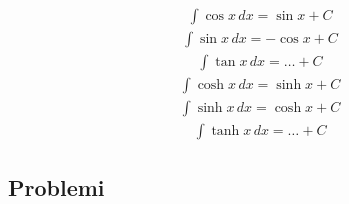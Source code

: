 \documentclass[letterpaper,10pt,italian]{jupyterBook}
\begin{document}
\begin{equation*}
\end{equation*}\begin{equation*}
\begin{split}\int \cos x \, dx = \sin x + C\end{split}
\end{equation*}\begin{equation*}
\begin{split}\int \sin x \, dx =-\cos x + C\end{split}
\end{equation*}\begin{equation*}
\begin{split}\int \tan x \, dx = \dots + C\end{split}
\end{equation*}\begin{equation*}
\begin{split}\int \cosh x \, dx = \sinh x + C\end{split}
\end{equation*}\begin{equation*}
\begin{split}\int \sinh x \, dx = \cosh x + C\end{split}
\end{equation*}\begin{equation*}
\begin{split}\int \tanh x \, dx = \dots + C\end{split}
\end{equation*}
\sphinxstepscope


\subsection{Problemi}
\label{\detokenize{ch/infinitesimal_calculus/integrals-problems:problemi}}\label{\detokenize{ch/infinitesimal_calculus/integrals-problems:infinitesimal-calculus-integrals-problems}}\label{\detokenize{ch/infinitesimal_calculus/integrals-problems::doc}}
\end{document}
